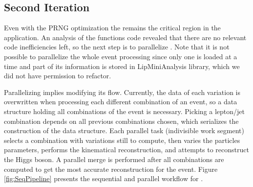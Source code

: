 \subsection{Second Iteration}

Even with the PRNG optimization the \ttDilepKinFit remains the critical region in the application. An analysis of the functions code revealed that there are no relevant code inefficiencies left, so the next step is to parallelize \ttDilepKinFit. Note that it is not possible to parallelize the whole event processing since only one is loaded at a time and part of its information is stored in LipMiniAnalysis library, which we did not have permission to refactor.

Parallelizing \ttDilepKinFit implies modifying its flow. Currently, the data of each variation is overwritten when processing each different combination of an event, so a data structure holding all combinations of the event is necessary. Picking a lepton/jet combination depends on all previous combinations chosen, which serializes the construction of the data structure. Each parallel task (indivisible work segment) selects a combination with variations still to compute, then varies the particles parameters, performs the kinematical reconstruction, and attempts to reconstruct the Higgs boson. A parallel merge is performed after all combinations are computed to get the most accurate reconstruction for the event. Figure \ref{fig:SeqPipeline} presents the sequential and parallel workflow for \ttDilepKinFit.

